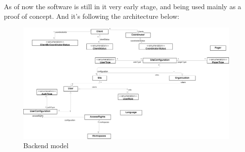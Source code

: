 As of now the software is still in it very early stage, and being used mainly as a proof of concept.
And it's following the architecture below:

\begin{figure}[!htbp]
    \centering
    \includegraphics[width=1\textwidth]{images/package.drawio}
    \caption{\footnotesize{Backend model}}
    \label{fig:backend}
\end{figure}


